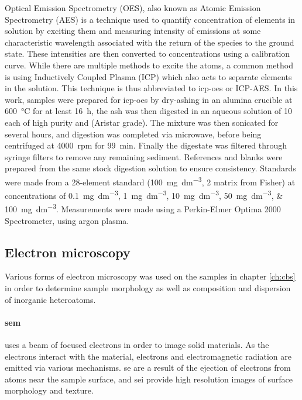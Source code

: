 Optical Emission Spectrometry (OES), also known as Atomic Emission Spectrometry (AES) is a technique used to quantify concentration of elements in solution by exciting them and measuring intensity of emissions at some characteristic wavelength associated with the return of the species to the ground state. These intensities are then converted to concentrations using a calibration curve. While there are multiple methods to excite the atoms, a common method is using Inductively Coupled Plasma (ICP) which also acts to separate elements in the solution. This technique is thus abbreviated to \acrshort{icp-oes} or ICP-AES.\citep{Hinners1988interlaboratory} In this work, samples were prepared for \acrshort{icp-oes} by dry-ashing in an alumina crucible at \qty{600}{\degreeCelsius} for at least \qty{16}{\hour}, the ash was then digested in an aqueous solution of \qty{10}{\volpercent} each of high purity  and  (Aristar grade). The mixture was then sonicated for several hours, and digestion was completed via microwave, before being centrifuged at \qty{4000}{rpm} for \qty{99}{\minute}. Finally the digestate was filtered through syringe filters to remove any remaining sediment. References and blanks were prepared from the same stock digestion solution to ensure consistency. Standards were made from a 28-element standard (\qty{100}{\mg\per\dm\cubed}, \qty{2}{\volpercent}  matrix from Fisher) at concentrations of \qtylist[list-units = single]{0.1;1;10;50;100}{\mg\per\dm\cubed}. Measurements were made using a Perkin-Elmer Optima 2000 Spectrometer, using argon plasma.

\subsection{Electron microscopy}

Various forms of electron microscopy was used on the samples in chapter \ref{ch:cbs} in order to determine sample morphology as well as composition and dispersion of inorganic heteroatoms.

\paragraph{\acrfull{sem}} uses a beam of focused electrons in order to image solid materials. As the electrons interact with the material, electrons and electromagnetic radiation are emitted via various mechanisms. \Acrfull{se} are a result of the ejection of electrons from atoms near the sample surface, and \acrfull{sei} provide high resolution images of surface morphology and texture.\citep{Goldstein2017Scanning} 

